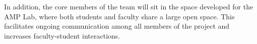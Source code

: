 In addition, the core members of the team will sit in the space developed for the AMP Lab, where both students and faculty share a large open space.  This facilitates ongoing communication among all members of the project and increases faculty-student interactions.


